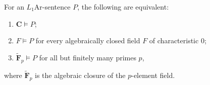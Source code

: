 For an $L_1\mathrm{Ar}$-sentence $P$, the following are equivalent:
\begin{enumerate}
\item $\mathbf{C} \vDash P$;
\item $F \vDash P$ for every algebraically closed field $F$ of characteristic $0$;
\item $\tilde{\mathbf{F}}_p \vDash P$ for all but finitely many primes $p$,
\end{enumerate}
where $\tilde{\mathbf{F}}_p$ is the algebraic closure of the $p$-element field.
